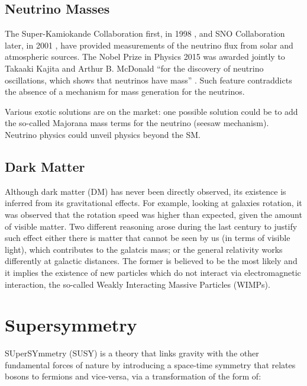 		\subsection*{Neutrino Masses}

			The Super-Kamiokande Collaboration first, in 1998 \cite{SK1998}, and SNO Collaboration later, in 2001 \cite{SNO2001}, have provided measurements of the neutrino flux from solar and atmospheric sources. 
			The Nobel Prize in Physics 2015 was awarded jointly to Takaaki Kajita and Arthur B. McDonald ``for the discovery of neutrino oscillations, which shows that neutrinos have mass'' \cite{Nobel2015}. Such feature contraddicts the absence of a mechanism for mass generation for the neutrinos. 

			Various exotic solutions are on the market: one possible solution could be to add the so-called Majorana mass terms for the neutrino (seesaw mechanism). Neutrino physics could unveil physics beyond the SM.



		\subsection*{Dark Matter}

			Although dark matter (DM) has never been directly observed, its existence is inferred from its gravitational effects. For example, looking at galaxies rotation, it was observed that the rotation speed was higher than expected, given the amount of visible matter. Two different reasoning arose during the last century to justify such effect either there is matter that cannot be seen by us (in terms of visible light), which contributes to the galatcis mass; or the general relativity works differently at galactic distances. The former is believed to be the most likely and it implies the existence of new particles which do not interact via electromagnetic interaction, the so-called Weakly Interacting Massive Particles (WIMPs).





	\section{Supersymmetry}
	\label{sec:SUSY}

		SUperSYmmetry (SUSY) is a theory that links gravity with the other fundamental forces of nature by introducing a space-time symmetry that relates bosons to fermions and vice-versa, via a transformation of the form of:  

